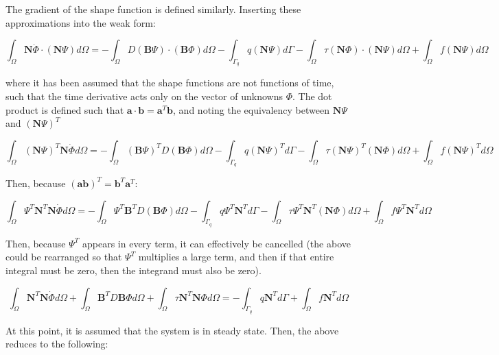\documentclass[10pt]{article}
\begin{document}
The gradient of the shape function is defined similarly. Inserting these approximations into the weak form:

\begin{equation}
\label{eq:FEStep1}
\int_{\Omega}\textbf{N}\dot{\Phi}\cdot(\textbf{N}\Psi)d\Omega=-\int_{\Omega}D(\textbf{B}\Psi)\cdot(\textbf{B}\Phi)d\Omega-\int_{\Gamma_q}q(\textbf{N}\Psi)d\Gamma-\int_{\Omega}\tau (\textbf{N}\Phi)\cdot(\textbf{N}\Psi)d\Omega+\int_{\Omega}f(\textbf{N}\Psi)d\Omega
\end{equation}

where it has been assumed that the shape functions are not functions of time, such that the time derivative acts only on the vector of unknowns \(\Phi\). The dot product is defined such that \(\textbf{a}\cdot\textbf{b}=\textbf{a}^T\textbf{b}\), and noting the equivalency between \(\textbf{N}\Psi\) and \((\textbf{N}\Psi)^T\)

\begin{equation}
\int_{\Omega}(\textbf{N}\Psi)^T\textbf{N}\dot{\Phi}d\Omega=-\int_{\Omega}(\textbf{B}\Psi)^TD(\textbf{B}\Phi)d\Omega-\int_{\Gamma_q}q(\textbf{N}\Psi)^Td\Gamma-\int_{\Omega}\tau (\textbf{N}\Psi)^T(\textbf{N}\Phi)d\Omega+\int_{\Omega}f(\textbf{N}\Psi)^Td\Omega
\end{equation}

Then, because \((\textbf{a}\textbf{b})^T=\textbf{b}^T\textbf{a}^T\):

\begin{equation}
\int_{\Omega}\Psi^T\textbf{N}^T\textbf{N}\dot{\Phi}d\Omega=-\int_{\Omega}\Psi^T\textbf{B}^TD(\textbf{B}\Phi)d\Omega-\int_{\Gamma_q}q\Psi^T\textbf{N}^Td\Gamma-\int_{\Omega}\tau \Psi^T\textbf{N}^T(\textbf{N}\Phi)d\Omega+\int_{\Omega}f\Psi^T\textbf{N}^Td\Omega
\end{equation}

Then, because \(\Psi^T\) appears in every term, it can effectively be cancelled (the above could be rearranged so that \(\Psi^T\) multiplies a large term, and then if that entire integral must be zero, then the integrand must also be zero). 

\begin{equation}
\label{eq:LastTransient}
\int_{\Omega}\textbf{N}^T\textbf{N}\dot{\Phi}d\Omega+\int_{\Omega}\textbf{B}^TD\textbf{B}\Phi d\Omega+\int_{\Omega}\tau \textbf{N}^T\textbf{N}\Phi d\Omega=-\int_{\Gamma_q}q\textbf{N}^Td\Gamma+\int_{\Omega}f\textbf{N}^Td\Omega
\end{equation}

At this point, it is assumed that the system is in steady state. Then, the above reduces to the following:
\end{document}
